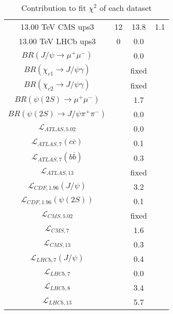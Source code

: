 \begin{table}[h!]
\begin{tabular}{c|c|c|c}
13.00 TeV CMS ups3 & 12 & 13.8 & 1.1 \\
13.00 TeV LHCb ups3 & 0 & 0.0 &  \\
\hline
$BR(J/\psi\rightarrow\mu^+\mu^-)$ &  & 0.0 &  \\
$BR(\chi_{c1}\rightarrow J/\psi\gamma)$ &  & fixed & \\
$BR(\chi_{c2}\rightarrow J/\psi\gamma)$ &  & fixed & \\
$BR(\psi(2S)\rightarrow\mu^+\mu^-)$ &  & 1.7 &  \\
$BR(\psi(2S)\rightarrow J/\psi\pi^+\pi^-)$ &  & 0.0 &  \\
$\mathcal L_{ATLAS,5.02}$ &  & 0.0 &  \\
$\mathcal L_{ATLAS,7}(c\overline c)$ &  & 0.1 &  \\
$\mathcal L_{ATLAS,7}(b\overline b)$ &  & 0.3 &  \\
$\mathcal L_{ATLAS,13}$ &  & fixed & \\
$\mathcal L_{CDF,1.96}(J/\psi)$ &  & 3.2 &  \\
$\mathcal L_{CDF,1.96}(\psi(2S))$ &  & 0.1 &  \\
$\mathcal L_{CMS,5.02}$ &  & fixed & \\
$\mathcal L_{CMS,7}$ &  & 1.6 &  \\
$\mathcal L_{CMS,13}$ &  & 0.3 &  \\
$\mathcal L_{LHCb,7}(J/\psi)$ &  & 0.4 &  \\
$\mathcal L_{LHCb,7}$ &  & 0.0 &  \\
$\mathcal L_{LHCb,8}$ &  & 3.4 &  \\
$\mathcal L_{LHCb,13}$ &  & 5.7 &  \\
\end{tabular}
\caption{Contribution to fit $\chi^2$ of each dataset}
\end{table}
